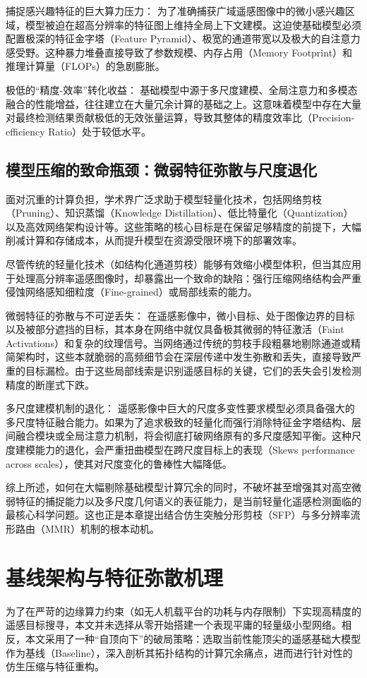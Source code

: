 捕捉感兴趣特征的巨大算力压力： 为了准确捕获广域遥感图像中的微小感兴趣区域，模型被迫在超高分辨率的特征图上维持全局上下文建模。这迫使基础模型必须配置极深的特征金字塔（Feature Pyramid）、极宽的通道带宽以及极大的自注意力感受野。这种暴力堆叠直接导致了参数规模、内存占用（Memory Footprint）和推理计算量（FLOPs）的急剧膨胀。

极低的“精度-效率”转化收益： 基础模型中源于多尺度建模、全局注意力和多模态融合的性能增益，往往建立在大量冗余计算的基础之上。这意味着模型中存在大量对最终检测结果贡献极低的无效张量运算，导致其整体的精度效率比（Precision-efficiency Ratio）处于较低水平。
\subsection{模型压缩的致命瓶颈：微弱特征弥散与尺度退化}
面对沉重的计算负担，学术界广泛求助于模型轻量化技术，包括网络剪枝（Pruning）、知识蒸馏（Knowledge Distillation）、低比特量化（Quantization）以及高效网络架构设计等。这些策略的核心目标是在保留足够精度的前提下，大幅削减计算和存储成本，从而提升模型在资源受限环境下的部署效率。

尽管传统的轻量化技术（如结构化通道剪枝）能够有效缩小模型体积，但当其应用于处理高分辨率遥感图像时，却暴露出一个致命的缺陷：强行压缩网络结构会严重侵蚀网络感知细粒度（Fine-grained）或局部线索的能力。

微弱特征的弥散与不可逆丢失： 在遥感影像中，微小目标、处于图像边界的目标以及被部分遮挡的目标，其本身在网络中就仅具备极其微弱的特征激活（Faint Activations）和复杂的纹理信号。当网络通过传统的剪枝手段粗暴地剔除通道或精简架构时，这些本就脆弱的高频细节会在深层传递中发生弥散和丢失，直接导致严重的目标漏检。由于这些局部线索是识别遥感目标的关键，它们的丢失会引发检测精度的断崖式下跌。

多尺度建模机制的退化： 遥感影像中巨大的尺度多变性要求模型必须具备强大的多尺度特征融合能力。如果为了追求极致的轻量化而强行消除特征金字塔结构、层间融合模块或全局注意力机制，将会彻底打破网络原有的多尺度感知平衡。这种尺度建模能力的退化，会严重扭曲模型在跨尺度目标上的表现（Skews performance across scales），使其对尺度变化的鲁棒性大幅降低。

综上所述，如何在大幅剔除基础模型计算冗余的同时，不破坏甚至增强其对高空微弱特征的捕捉能力以及多尺度几何语义的表征能力，是当前轻量化遥感检测面临的最核心科学问题。这也正是本章提出结合仿生突触分形剪枝（SFP）与多分辨率流形路由（MMR）机制的根本动机。

\section{基线架构与特征弥散机理}
为了在严苛的边缘算力约束（如无人机载平台的功耗与内存限制）下实现高精度的遥感目标搜寻，本文并未选择从零开始搭建一个表现平庸的轻量级小型网络。相反，本文采用了一种“自顶向下”的破局策略：选取当前性能顶尖的遥感基础大模型作为基线（Baseline），深入剖析其拓扑结构的计算冗余痛点，进而进行针对性的仿生压缩与特征重构。

